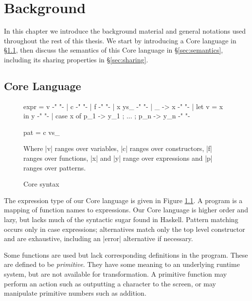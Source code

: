 

\chapter{Background}
\label{chp:background}

In this chapter we introduce the background material and general notations used throughout the rest of this thesis. We start by introducing a Core language in \S\ref{sec:core}, then discuss the semantics of this Core language in \S\ref{sec:semantics}, including its sharing properties in \S\ref{sec:sharing}.

\section{Core Language}
\label{sec:core}

\begin{figure}
\begin{code}
expr  =  v                                          {-"  "-}
      |  c                                          {-"  "-}
      |  f                                          {-"  "-}
      |  x ys_                                      {-"  "-}
      |  \vs_ -> x                                  {-"  "-}
      |  let v = x in y                             {-"  "-}
      |  case x of {p_1 -> y_1 ; ... ; p_n -> y_n}  {-"  "-}

pat   =  c vs_
\end{code}

Where |v| ranges over variables, |c| ranges over constructors, |f| ranges over functions, |x| and |y| range over expressions and |p| ranges over patterns.
\caption{Core syntax}
\label{fig:core}
\end{figure}

The expression type of our Core language is given in Figure \ref{fig:core}. A program is a mapping of function names to expressions. Our Core language is higher order and lazy, but lacks much of the syntactic sugar found in Haskell. Pattern matching occurs only in case expressions; alternatives match only the top level constructor and are exhaustive, including an |error| alternative if necessary.

Some functions are used but lack corresponding definitions in the program. These are defined to be \textit{primitive}. They have some meaning to an underlying runtime system, but are not available for transformation. A primitive function may perform an action such as outputting a character to the screen, or may manipulate primitive numbers such as addition.


